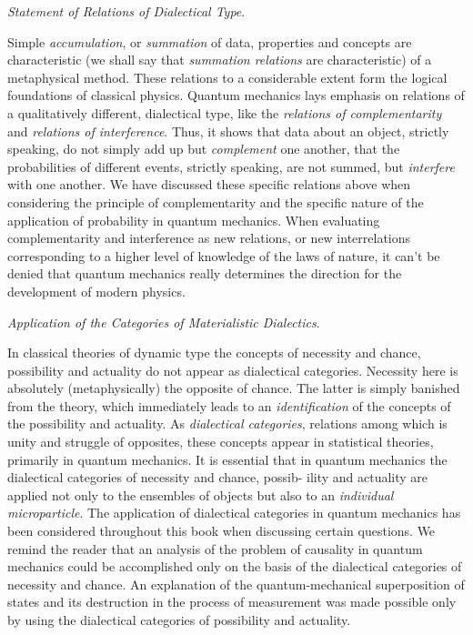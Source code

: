 \documentclass[a4paper,sfsidenotes,colorlinks=true]{tufte-book}
\numberwithin{equation}{section}
\numberwithin{figure}{section}
\begin{document}
\emph{Statement of Relations of Dialectical Type}.  

Simple \emph{accumulation}, or \emph{summation} of data, properties
and concepts are characteristic (we shall say that \emph{summation
  relations} are characteristic) of a metaphysical method. These
relations to a considerable extent form the logical foundations of
classical physics. Quantum mechanics lays emphasis on relations of a
qualitatively different, dialectical type, like the \emph{relations of
  complementarity} and \emph{relations of interference}. Thus, it
shows that data about an object, strictly speaking, do not simply add
up but \emph{complement} one another, that the probabilities of
different events, strictly speaking, are not summed, but
\emph{interfere} with one another. We have discussed these specific
relations above when considering the principle of complementarity and
the specific nature of the application of probability in quantum
mechanics. When evaluating complementarity and interference as new
relations, or new interrelations corresponding to a higher level of
knowledge of the laws of nature, it can't be denied that quantum
mechanics really determines the direction for the development of
modern physics.

\emph{Application of the Categories of Materialistic Dialectics}. 

In classical theories of dynamic type the concepts of necessity and
chance, possibility and actuality do not appear as dialectical
categories. Necessity here is absolutely (metaphysically) the opposite
of chance. The latter is simply banished from the theory, which
immediately leads to an \emph{identification} of the concepts of the
possibility and actuality. As \emph{dialectical categories}, relations
among which is unity and struggle of opposites, these concepts appear
in statistical theories, primarily in quantum mechanics. It is
essential that in quantum mechanics the dialectical categories of
necessity and chance, possib- ility and actuality are applied not only
to the ensembles of objects but also to an \emph{individual
  microparticle}. The application of dialectical categories in quantum
mechanics has been considered throughout this book when discussing
certain questions. We remind the reader that an analysis of the
problem of causality in quantum mechanics could be accomplished only
on the basis of the dialectical categories of necessity and chance. An
explanation of the quantum-mechanical superposition of states and its
destruction in the process of measurement was made possible only by
using the dialectical categories of possibility and actuality.
\end{document}
